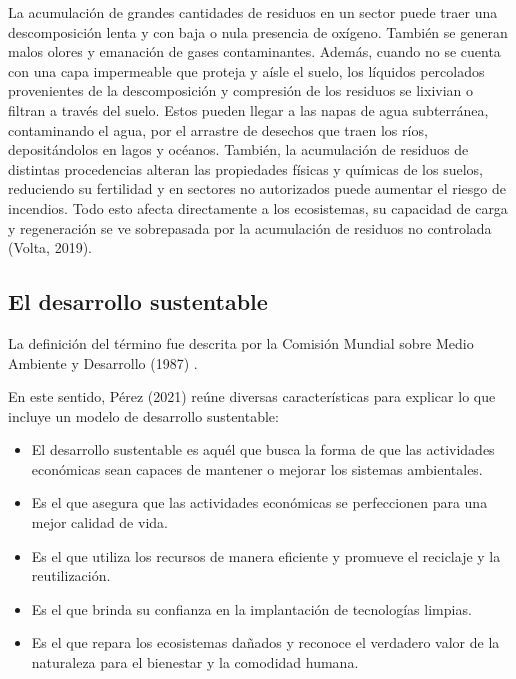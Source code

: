 La acumulación de grandes cantidades de residuos en un sector  puede traer una descomposición lenta y con baja o nula presencia de oxígeno. También se generan malos olores y emanación de gases contaminantes. Además, cuando no se cuenta con una capa impermeable que proteja y aísle el suelo, los líquidos percolados provenientes de la descomposición y compresión de los residuos se lixivian o filtran a través del suelo. Estos  pueden llegar a las napas de agua subterránea, contaminando el agua, por el arrastre de desechos que traen los ríos, depositándolos en lagos y océanos. También, la acumulación de residuos de distintas procedencias alteran las propiedades físicas y químicas de los suelos, reduciendo su fertilidad y en sectores no autorizados puede aumentar el riesgo de incendios. Todo esto afecta directamente a los ecosistemas, su capacidad de carga y regeneración se ve sobrepasada por la acumulación de residuos no controlada (Volta, 2019).

\subsection{El desarrollo sustentable}

La definición del término fue descrita por la Comisión Mundial sobre Medio Ambiente y Desarrollo (1987) .

En este sentido, Pérez (2021) reúne diversas características para explicar lo que incluye un modelo de desarrollo sustentable:

\begin{itemize}
    \item El desarrollo sustentable es aquél que busca la forma de que las actividades económicas sean capaces de mantener o mejorar los sistemas ambientales.
    
    \item Es el que asegura que las actividades económicas se perfeccionen para una mejor calidad de vida.
    
    \item Es el que utiliza los recursos de manera eficiente y promueve el reciclaje y la reutilización.
    
    \item Es el que brinda su confianza en la implantación de tecnologías limpias.
    
    \item Es el que repara los ecosistemas dañados y reconoce el verdadero valor de la naturaleza para el bienestar y la comodidad humana.
\end{itemize}

